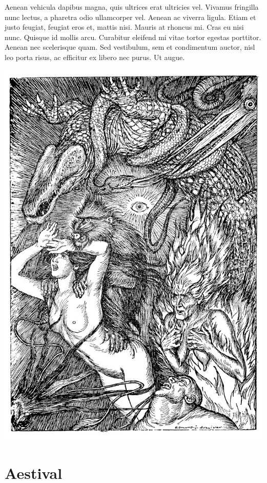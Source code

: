 \documentclass{amsbook}
\begin{document}
Aenean vehicula dapibus magna, quis ultrices erat ultricies vel. Vivamus fringilla nunc lectus, a pharetra odio ullamcorper vel. Aenean ac viverra ligula. Etiam et justo feugiat, feugiat eros et, mattis nisi. Mauris at rhoncus mi. Cras eu nisi nunc. Quisque id mollis arcu. Curabitur eleifend mi vitae tortor egestas porttitor. Aenean nec scelerisque quam. Sed vestibulum, sem et condimentum auctor, nisl leo porta risus, ac efficitur ex libero nec purus. Ut augue.

\clearpage

\thispagestyle{empty}
\vspace*{\fill}
{\centering
\includegraphics[width=\textwidth]{images/placeholder_image.jpg}}
\vspace*{\fill}
\clearpage

\chapter{Aestival}
\end{document}
